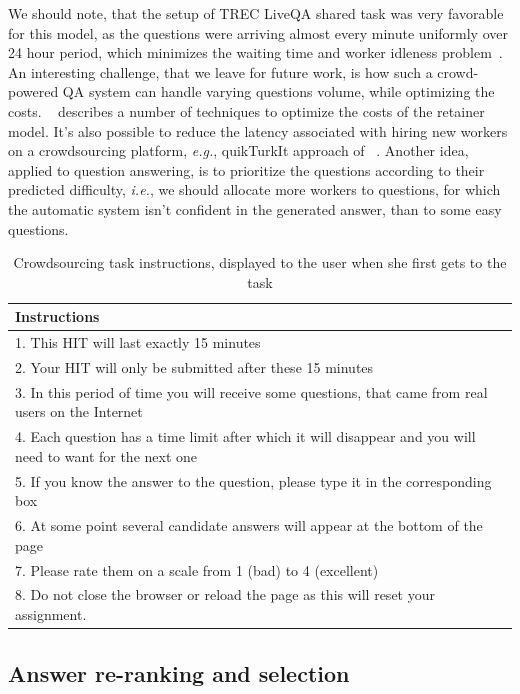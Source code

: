 We should note, that the setup of TREC LiveQA shared task was very favorable for this model, as the questions were arriving almost every minute uniformly over 24 hour period, which minimizes the waiting time and worker idleness problem~\cite{Lasecki:2013:CCC:2501988.2502057}.
An interesting challenge, that we leave for future work, is how such a crowd-powered QA system can handle varying questions volume, while optimizing the costs.
~\cite{bernstein2012analytic} describes a number of techniques to optimize the costs of the retainer model.
It's also possible to reduce the latency associated with hiring new workers on a crowdsourcing platform, \textit{e.g.}, quikTurkIt approach of ~\cite{bigham2010vizwiz}.
Another idea, applied to question answering, is to prioritize the questions according to their predicted difficulty, \textit{i.e.}, we should allocate more workers to questions, for which the automatic system isn't confident in the generated answer, than to some easy questions.

\begin{table}[ht]
\centering
\begin{tabular}{| p{8cm} |}
\hline
\textbf{Instructions} \\
\hline
1. This HIT will last exactly 15 minutes\\
2. Your HIT will only be submitted after these 15 minutes\\
3. In this period of time you will receive some questions, that came from real users on the Internet\\
4. Each question has a time limit after which it will disappear and you will need to want for the next one\\
5. If you know the answer to the question, please type it in the corresponding box\\
6. At some point several candidate answers will appear at the bottom of the page\\
7. Please rate them on a scale from 1 (bad) to 4 (excellent)\\
8. Do not close the browser or reload the page as this will reset your assignment.\\
\hline
\end{tabular}
\caption{Crowdsourcing task instructions, displayed to the user when she first gets to the task}
\label{table:crowd_instructions}
\end{table}

\subsection{Answer re-ranking and selection}
\label{sec:system:reranking}

